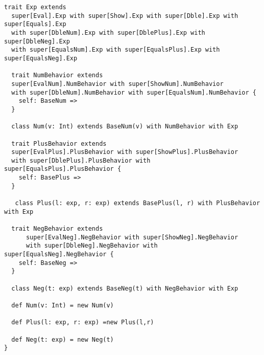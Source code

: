 \begin{lstlisting}[basicstyle=\tiny]
  trait Exp extends 
  super[Eval].Exp with super[Show].Exp with super[Dble].Exp with super[Equals].Exp
  with super[DbleNum].Exp with super[DblePlus].Exp with super[DbleNeg].Exp
  with super[EqualsNum].Exp with super[EqualsPlus].Exp with super[EqualsNeg].Exp

  trait NumBehavior extends
  super[EvalNum].NumBehavior with super[ShowNum].NumBehavior
  with super[DbleNum].NumBehavior with super[EqualsNum].NumBehavior {
    self: BaseNum =>
  }

  class Num(v: Int) extends BaseNum(v) with NumBehavior with Exp

  trait PlusBehavior extends
  super[EvalPlus].PlusBehavior with super[ShowPlus].PlusBehavior
  with super[DblePlus].PlusBehavior with super[EqualsPlus].PlusBehavior {
    self: BasePlus =>
  }

   class Plus(l: exp, r: exp) extends BasePlus(l, r) with PlusBehavior with Exp

  trait NegBehavior extends
      super[EvalNeg].NegBehavior with super[ShowNeg].NegBehavior
      with super[DbleNeg].NegBehavior with super[EqualsNeg].NegBehavior {
    self: BaseNeg =>
  }

  class Neg(t: exp) extends BaseNeg(t) with NegBehavior with Exp
  
  def Num(v: Int) = new Num(v)
  
  def Plus(l: exp, r: exp) =new Plus(l,r)

  def Neg(t: exp) = new Neg(t)
}
\end{lstlisting}


